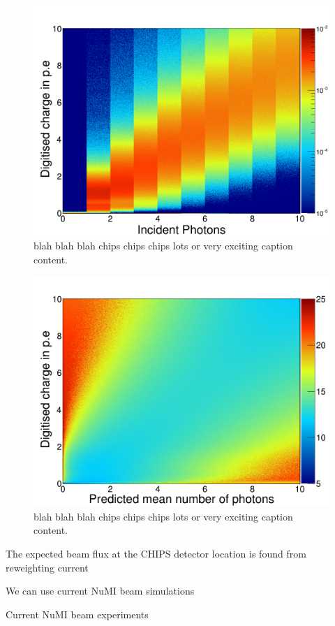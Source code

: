 \begin{figure}
    \includegraphics[width=\largefigwidth]{diagrams/cvn/digi_method}
    \caption[digi_method]%
    {blah blah blah chips chips chips lots or very exciting caption content.}
    \label{fig:digi_method}
\end{figure}

\begin{figure}
    \includegraphics[width=\largefigwidth]{diagrams/cvn/digi_likelihood}
    \caption[digi_likelihood]%
    {blah blah blah chips chips chips lots or very exciting caption content.}
    \label{fig:digi_likelihood}
\end{figure}

The expected beam flux at the CHIPS detector location is found from reweighting current

We can use current NuMI beam simulations

Current NuMI beam experiments

